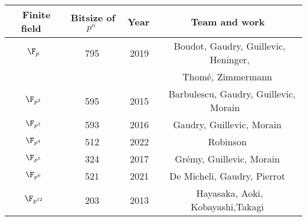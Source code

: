 \documentclass[preview]{standalone}
\begin{document}
\begin{center}
\begin{tabular}{|c|c|c|c|}
   \hline
     $ \,$ Finite field $ \,$ &$ \,$Bitsize of $p^n \,$ &$ \,$ Year$ \,$& $ \,$Team and work $ \,$\\
     \hline
     $\F_p$ & 795 & 2019 & Boudot, Gaudry, Guillevic, Heninger, \\
     &&&Thom\'{e}, Zimmermann~\cite{C:BGGHTZ20}\\ 
     $\F_{p^2}$ &  595 & 2015 & $ \,$ Barbulescu, Gaudry, Guillevic, Morain~\cite{EC:BGGM15} $\,$ \\ 
     $\F_{p^3}$ & 593 & 2016 & Gaudry, Guillevic, Morain~\cite{GaGuMo16email}\\ 
     $\F_{p^4}$ & 512& 2022 & Robinson~\cite{DBLP:journals/corr/abs-2212-04999} \\ 
      $\F_{p^5}$ & 324& 2017 & Gr\'{e}my, Guillevic, Morain~\cite{gremy:hal-01568373}\\ 
      $\F_{p^6}$ & 521& 2021 & De Micheli, Gaudry, Pierrot~\cite{AC:DeMGauPie21}\\
      $\F_{p^{12}}$ & 203& 2013 &Hayasaka, Aoki, Kobayashi,Takagi~\cite{Kenichiro:Hayasaka2014}\\
     \hline
   \end{tabular}
\end{center}
\end{document}
